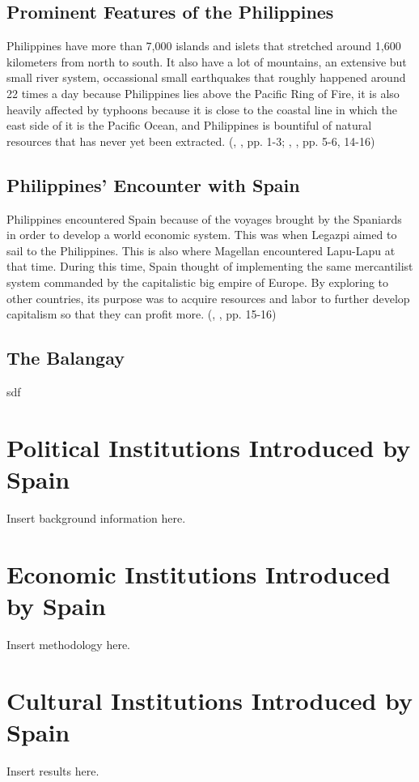 \documentclass[12pt]{article}
\begin{document}
  \subsection{Prominent Features of the Philippines}
  Philippines have more than 7,000 islands and islets that stretched around 1,600 kilometers from north to south. It also have a lot of mountains, an extensive but small
  river system, occassional small earthquakes that roughly happened around 22 times a day because Philippines lies above the Pacific Ring of Fire, it is also heavily affected
  by typhoons because it is close to the coastal line in which the east side of it is the Pacific Ocean, and Philippines is bountiful of natural resources that
  has never yet been extracted. (\citeauthor{agoncillo1990filipino}, \citeyear{agoncillo1990filipino}, pp. 1-3; \citeauthor{foreman1899islands}, \citeyear{foreman1899islands}, pp. 5-6, 14-16)
   
  \subsection{Philippines' Encounter with Spain}
  Philippines encountered Spain because of the voyages brought by the Spaniards in order to develop a world economic system. This was when Legazpi aimed to sail
  to the Philippines. This is also where Magellan encountered Lapu-Lapu at that time. During this time, Spain thought of implementing the same mercantilist system
  commanded by the capitalistic big empire of Europe. By exploring to other countries, its purpose was to acquire resources and labor to further develop
  capitalism so that they can profit more. (\citeauthor{constantino1975history}, \citeyear{constantino1975history}, pp. 15-16)
  

  \subsection{The Balangay}
  sdf






\section{Political Institutions Introduced by Spain}
Insert background information here.






\section{Economic Institutions Introduced by Spain}
Insert methodology here.





\section{Cultural Institutions Introduced by Spain}
Insert results here.








\end{document}
